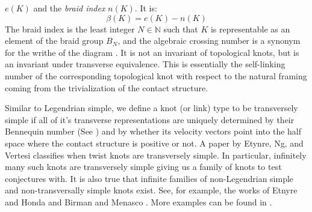     $e(K)$ and the \textit{braid index} $n(K)$. It is:
    \begin{equation}
        \beta(K)=e(K)-n(K)
    \end{equation}
    The braid index is the least integer $N\in\mathbb{N}$ such that $K$
    is representable as an element of the braid group $B_{N}$, and the
    algebraic crossing number is a synonym for the writhe of the diagram
    \cite{KawamuroAlgCrossNumberAndBraidIndex}.
    It is not an invariant of topological knots, but is an invariant under
    transverse equivalence. This is essentially the self-linking number of
    the corresponding topological knot with respect to the natural framing
    coming from the trivialization of the contact structure.
    \par\hfill\par
    Similar to Legendrian simple, we define a knot
    (or link) type to be transversely simple if all of it's transverse
    representations are uniquely determined by their Bennequin number
    (See \cite{BirmanWrinkleTransversallySimpleKnots}) and by whether its
    velocity vectors point into the half space where the contact structure
    is positive or not. A paper by Etynre, Ng, and Vertesi
    \cite{EtnyreEtAlLegendrianAndTransverseTwistKnots}
    classifies when twist knots are transversely simple. In
    particular, infinitely many such knots are transversely simple giving
    us a family of knots to test conjectures with. It is also true that
    infinite families of non-Legendrian simple and non-transversally simple
    knots exist. See, for example, the works of Etnyre and Honda
    \cite{EtnyreHondaCabling} and Birman and Menasco
    \cite{BirmanMenasco2006}. More examples can be found in
    \cite{Foldvari2019legnonsimple}.

